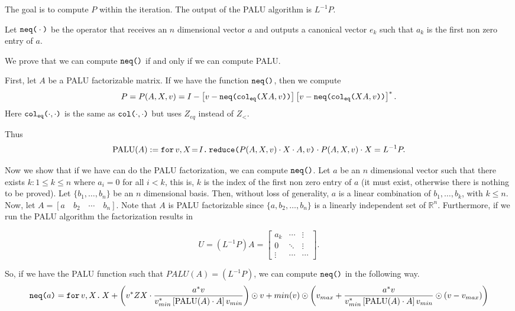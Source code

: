 The goal is to compute $P$ within the iteration. The output of the PALU algorithm is $L^{-1}P$.

Let $\nneq{\cdot}$ be the operator that receives an $n$ dimensional vector $a$ and outputs a canonical vector $e_k$ such that $a_k$ is the first non zero entry of $a$. 

We prove that we can compute $\nneq$ if and only if we can compute PALU.

First, let $A$ be a PALU factorizable matrix. If we have the function $\nneq$, then we compute $$P=P(A,X,v) = I - \left[ v - \nneq{ \ccoleq{XA}{v} } \right]\left[ v - \nneq{ \ccoleq{XA}{v} } \right]^*.$$ Here $\ccoleq{\cdot}{\cdot}$ is the same as $\ccol{\cdot}{\cdot}$ but uses $Z_{eq}$ instead of $Z_{<}$.

Thus $$\text{PALU}(A):=\initf{I}{v}{X}{\red{P(A,X,v)\cdot X\cdot A}{v}\cdot P(A,X,v)\cdot X}= L^{-1}P.$$

Now we show that if we have can do the PALU factorization, we can compute $\nneq$. Let $a$ be an $n$ dimensional vector such that there exists $k:1\leq k\leq n$ where $a_i=0$ for all $i<k$, this is, $k$ is the index of the first non zero entry of $a$ (it must exist, otherwise there is nothing to be proved). Let $\lbrace b_1, \ldots, b_n\rbrace$ be an $n$ dimensional basis. Then, without loss of generality, $a$ is a linear combination of $b_1, \ldots, b_k$, with $k \leq n$. Now, let $A = \left[ a\hspace{1em} b_2 \hspace{1em} \cdots \hspace{1em}  b_n \right].$ Note that $A$ is PALU factorizable since $\lbrace a, b_2, \ldots, b_n\rbrace$ is a linearly independent set of $\mathbb{R}^n$. Furthermore, if we run the PALU algorithm the factorization results in

\[
U=(L^{-1}P)A = \begin{bmatrix}
    a_k & \cdots &  \vdots \\
    0 & \ddots & \vdots \\
    \vdots & \cdots & \cdots 
\end{bmatrix}.
\]

So, if we have the PALU function such that $PALU(A)=(L^{-1}P)$, we can compute $\nneq$ in the following way. $$\nneq{a}=\ffor{v}{X}{X+\left( v^*ZX\cdot\dfrac{a^*v}{v_{min}^*\left[ \text{PALU}(A)\cdot A\right]v_{min}} \right)\odot v + min(v)\odot\left( v_{max} + \dfrac{a^*v}{v_{min}^*\left[ \text{PALU}(A)\cdot A\right]v_{min}}\odot (v-v_{max})\right)}$$

